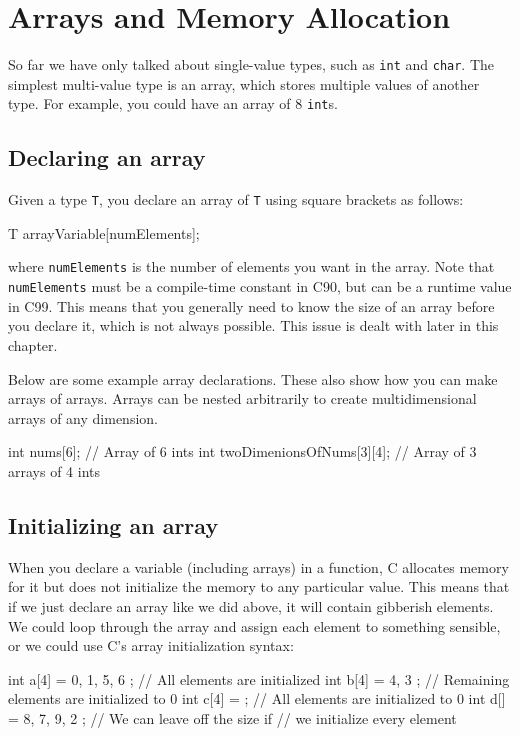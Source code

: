 
\chapter{Arrays and Memory Allocation}

So far we have only talked about single-value types, such as \texttt{int} and \texttt{char}.
The simplest multi-value type is an array, which stores multiple values of another type.
For example, you could have an array of 8 \texttt{int}s.

\section{Declaring an array}

Given a type \texttt{T}, you declare an array of \texttt{T} using square brackets as follows:
\begin{codeinline}
T arrayVariable[numElements];
\end{codeinline}
where \texttt{numElements} is the number of elements you want in the array.
Note that \texttt{numElements} must be a compile-time constant in C90, but can be a runtime value in C99.
This means that you generally need to know the size of an array before you declare it, which is not always possible.
This issue is dealt with later in this chapter.

Below are some example array declarations.
These also show how you can make arrays of arrays.
Arrays can be nested arbitrarily to create multidimensional arrays of any dimension.

\begin{codeblock}
int nums[6]; // Array of 6 ints
int twoDimenionsOfNums[3][4]; // Array of 3 arrays of 4 ints
\end{codeblock}

\section{Initializing an array}

When you declare a variable (including arrays) in a function, C allocates memory for it but does not initialize the memory to any particular value.
This means that if we just declare an array like we did above, it will contain gibberish elements.
We could loop through the array and assign each element to something sensible, or we could use C's array initialization syntax:

\begin{codeblock}
int a[4] = { 0, 1, 5, 6 }; // All elements are initialized
int b[4] = { 4, 3 }; // Remaining elements are initialized to 0
int c[4] = { }; // All elements are initialized to 0
int d[] = { 8, 7, 9, 2 }; // We can leave off the size if
                             // we initialize every element
\end{codeblock}

